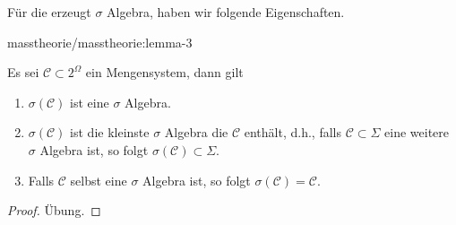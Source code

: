 \documentclass[letterpaper,10pt,german]{jupyterBook}
\begin{document}
\par
Für die erzeugt \(\sigma\) Algebra, haben wir folgende Eigenschaften.
\begin{lemma}{}{masstheorie/masstheorie:lemma-3}



\par
Es sei \(\mathcal{C}\subset 2^\Omega\) ein Mengensystem, dann gilt
\begin{enumerate}

\item {} 
\par
\(\sigma(\mathcal{C})\) ist eine \(\sigma\) Algebra.

\item {} 
\par
\(\sigma(\mathcal{C})\) ist die kleinste \(\sigma\) Algebra die \(\mathcal{C}\) enthält, d.h., falls \(\mathcal{C}\subset\Sigma\) eine weitere \(\sigma\) Algebra ist, so folgt \(\sigma(\mathcal{C})\subset\Sigma\).

\item {} 
\par
Falls \(\mathcal{C}\) selbst eine \(\sigma\) Algebra ist, so folgt \(\sigma(\mathcal{C}) = \mathcal{C}\).

\end{enumerate}
\end{lemma}

\begin{proof}
 Übung.
\end{proof}
\end{document}
